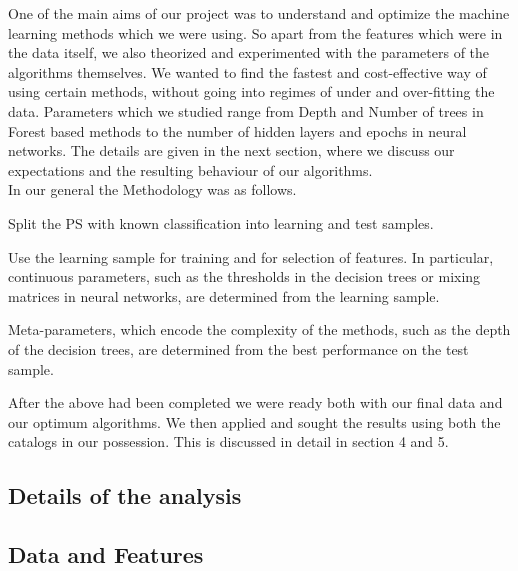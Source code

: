 One of the main aims of our project was to understand and optimize the machine learning methods which we were using. So apart from the features which were in the data itself, we also theorized and experimented with the parameters of the algorithms themselves. We wanted to find the fastest and cost-effective way of using certain methods, without going into regimes of under and over-fitting the data. Parameters which we studied range from Depth and Number of trees in Forest based methods to the number of hidden layers and epochs in neural networks. The details are given in the next section, where we discuss our expectations and the resulting behaviour of our algorithms.\\
  
In our general the Methodology was as follows.
\ben
\item
Split the PS with known classification into learning and test samples.
\item
Use the learning sample for training and for selection of features.
In particular, continuous parameters, such as the thresholds in the decision trees or mixing matrices in neural networks, are determined from the learning sample. 
\item
Meta-parameters, which encode the complexity of the methods, such as the depth of the decision trees,
are determined from the best performance on the test sample.
\een

After the above had been completed we were ready both with our final data and our optimum algorithms. We then applied and sought the results using both the catalogs in our possession. This is discussed in detail in section 4 and 5.\\

\subsection{Details of the analysis}

\subsection{Data and Features}

